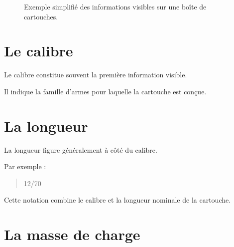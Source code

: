 \begin{figure}[htbp]
\centering


\caption{Exemple simplifié des informations visibles sur une boîte de cartouches.}
\label{fig:boite_cartouches}

\end{figure}


\section{Le calibre}

Le calibre constitue souvent la première information visible.

Il indique la famille d'armes pour laquelle la cartouche est conçue.

\section{La longueur}

La longueur figure généralement à côté du calibre.

Par exemple :

\begin{quote}
12/70
\end{quote}

Cette notation combine le calibre et la longueur nominale de la cartouche.

\section{La masse de charge}

